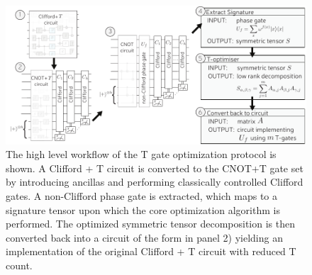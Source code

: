 \documentclass[notitlepage]{article}
\theoremstyle{definition}
\theoremstyle{problem}
\theoremstyle{lemma}
\begin{document}
\begin{figure}[h!]		
	\includegraphics{Overview3}
	\caption{The high level workflow of the T gate optimization protocol is shown. A Clifford + T circuit is converted to the CNOT+T gate set by introducing ancillas and performing classically controlled Clifford gates. A non-Clifford phase gate is extracted, which maps to a signature tensor upon which the core optimization algorithm is performed. The optimized symmetric tensor decomposition is then converted back into a circuit of the form in panel 2) yielding an implementation of the original Clifford + T circuit with reduced T count. }
	\label{fig_overview}
\end{figure}
\end{document}
